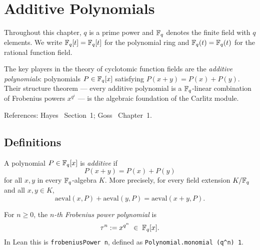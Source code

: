 
\chapter{Additive Polynomials}
\label{chap:additive}

Throughout this chapter, $q$ is a prime power and $\mathbb{F}_q$ denotes the finite field
with $q$ elements.
We write $\mathbb{F}_q[t] = \mathbb{F}_q[t]$ for the polynomial ring and $\mathbb{F}_q(t) = \mathbb{F}_q(t)$ for the rational
function field.

The key players in the theory of cyclotomic function fields are the
\emph{additive polynomials}: polynomials $P \in \mathbb{F}_q[x]$ satisfying
$P(x+y) = P(x) + P(y)$.
Their structure theorem — every additive polynomial is a $\mathbb{F}_q$-linear combination
of Frobenius powers $x^{q^i}$ — is the algebraic foundation of the Carlitz module.

References: Hayes~\cite{hayes1974} Section~1; Goss~\cite{goss1996} Chapter~1.

\section{Definitions}
\label{sec:additive_defs}

\begin{definition}
  \label{def:is_additive}
  \leanok
  A polynomial $P \in \mathbb{F}_q[x]$ is \emph{additive} if
  \[
    P(x + y) = P(x) + P(y)
  \]
  for all $x, y$ in every $\mathbb{F}_q$-algebra $K$.
  More precisely, for every field extension $K/\mathbb{F}_q$ and all $x, y \in K$,
  \[
    \mathrm{aeval}(x, P) + \mathrm{aeval}(y, P) = \mathrm{aeval}(x+y, P).
  \]
\end{definition}

\begin{definition}
  \label{def:frobenius_power}
  \leanok
  For $n \geq 0$, the \emph{$n$-th Frobenius power polynomial} is
  \[
    \tau^n := x^{q^n} \;\in\; \mathbb{F}_q[x].
  \]
  In Lean this is \texttt{frobeniusPower n}, defined as
  \texttt{Polynomial.monomial (q\^{}n) 1}.
\end{definition}

